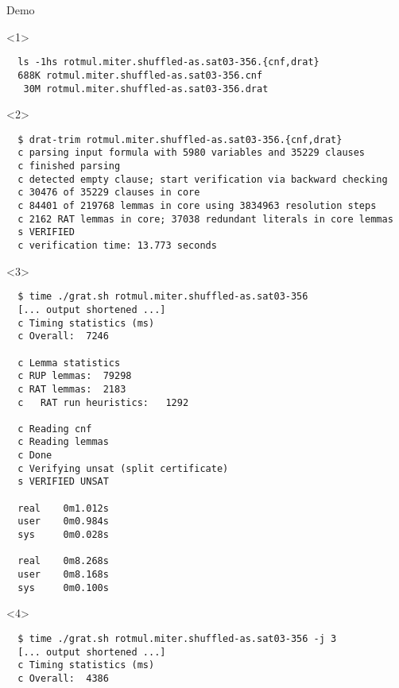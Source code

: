 \documentclass[fleqn]{beamer}
\begin{document}
\begin{frame}[t,fragile]{Demo}
% 
%   
  \scriptsize
  \begin{onlyenv}<1>
  \begin{verbatim}  
  ls -1hs rotmul.miter.shuffled-as.sat03-356.{cnf,drat}
  688K rotmul.miter.shuffled-as.sat03-356.cnf
   30M rotmul.miter.shuffled-as.sat03-356.drat
  \end{verbatim}
  \end{onlyenv}

  \begin{onlyenv}<2>
  \begin{verbatim}  
  $ drat-trim rotmul.miter.shuffled-as.sat03-356.{cnf,drat}
  c parsing input formula with 5980 variables and 35229 clauses
  c finished parsing
  c detected empty clause; start verification via backward checking
  c 30476 of 35229 clauses in core
  c 84401 of 219768 lemmas in core using 3834963 resolution steps
  c 2162 RAT lemmas in core; 37038 redundant literals in core lemmas
  s VERIFIED
  c verification time: 13.773 seconds
  \end{verbatim}  
  \end{onlyenv}

  \begin{onlyenv}<3>
  \begin{verbatim}  
  $ time ./grat.sh rotmul.miter.shuffled-as.sat03-356
  [... output shortened ...]
  c Timing statistics (ms)
  c Overall:  7246

  c Lemma statistics
  c RUP lemmas:  79298
  c RAT lemmas:  2183
  c   RAT run heuristics:   1292

  c Reading cnf
  c Reading lemmas
  c Done
  c Verifying unsat (split certificate)
  s VERIFIED UNSAT

  real    0m1.012s
  user    0m0.984s
  sys     0m0.028s

  real    0m8.268s
  user    0m8.168s
  sys     0m0.100s

  \end{verbatim}  
  \end{onlyenv}

  \begin{onlyenv}<4>
  \begin{verbatim}  
  $ time ./grat.sh rotmul.miter.shuffled-as.sat03-356 -j 3
  [... output shortened ...]
  c Timing statistics (ms)
  c Overall:  4386


\end{verbatim}
\end{onlyenv}
\end{frame}
\end{document}
